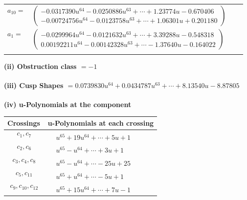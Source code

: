 \documentclass[1p]{elsarticle_modified}
\theoremstyle{definition}
\begin{document}
\begin{tabular}{m{7pt} m{180pt} m{7pt} m{180pt} }
\flushright $a_{10}=$&$\begin{pmatrix}-0.0317390 u^{64}-0.0250886 u^{63}+\cdots+1.23774 u-0.670406\\-0.00724756 u^{64}-0.0123758 u^{63}+\cdots+1.06301 u+0.201180\end{pmatrix}$ \\
\flushright $a_{1}=$&$\begin{pmatrix}-0.0299964 u^{64}-0.0121632 u^{63}+\cdots+3.39288 u-0.548318\\0.00192211 u^{64}-0.00142328 u^{63}+\cdots-1.37640 u-0.164022\end{pmatrix}$\\&\end{tabular}
\flushleft \textbf{(ii) Obstruction class $= -1$}\\~\\
\flushleft \textbf{(iii) Cusp Shapes $= 0.0739830 u^{64}+0.0434787 u^{63}+\cdots+8.13540 u-8.87805$}\\~\\
\newpage\renewcommand{\arraystretch}{1}
\flushleft \textbf{(iv) u-Polynomials at the component}\newline \\
\begin{tabular}{m{50pt}|m{274pt}}
Crossings & \hspace{64pt}u-Polynomials at each crossing \\
\hline $$\begin{aligned}c_{1},c_{7}\end{aligned}$$&$\begin{aligned}
&u^{65}+19 u^{64}+\cdots+5 u+1
\end{aligned}$\\
\hline $$\begin{aligned}c_{2},c_{6}\end{aligned}$$&$\begin{aligned}
&u^{65}- u^{64}+\cdots+3 u+1
\end{aligned}$\\
\hline $$\begin{aligned}c_{3},c_{4},c_{8}\end{aligned}$$&$\begin{aligned}
&u^{65}- u^{64}+\cdots-25 u+25
\end{aligned}$\\
\hline $$\begin{aligned}c_{5},c_{11}\end{aligned}$$&$\begin{aligned}
&u^{65}+u^{64}+\cdots-5 u+1
\end{aligned}$\\
\hline $$\begin{aligned}c_{9},c_{10},c_{12}\end{aligned}$$&$\begin{aligned}
&u^{65}+15 u^{64}+\cdots+7 u-1
\end{aligned}$\\
\hline
\end{tabular}\\~\\
\end{document}
